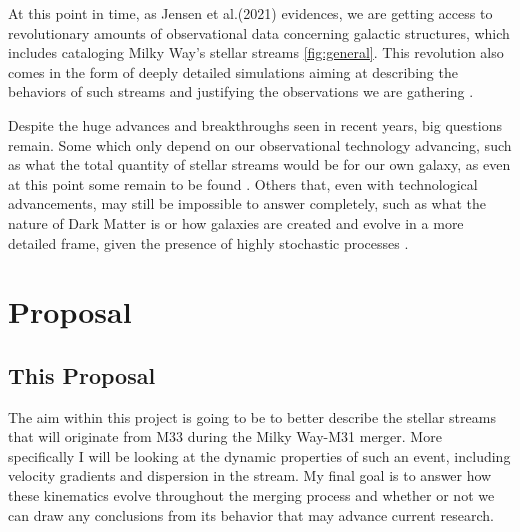 \documentclass[linenumbers,trackchanges]{aastex7}
\begin{document}
At this point in time, as Jensen et al.(2021) evidences, we are getting access to revolutionary amounts of observational data concerning galactic structures, which includes cataloging Milky Way's stellar streams \citep{Malhan2018-mh}\ref{fig:general}. This revolution also comes in the form of deeply detailed simulations aiming at describing the behaviors of such streams and justifying the observations we are gathering \citep{Choi2007-lc}.

\begin{figure*}[ht!]
\caption{Chart demonstrating potential stream stars identified in \citep{Malhan2018-mh}. This evidences the astounding capability we have to identify these objects, however this only accounts for a small portion of all stream stars.}
\label{fig:general}
\end{figure*}

Despite the huge advances and breakthroughs seen in recent years, big questions remain. Some which only depend on our observational technology advancing, such as what the total quantity of stellar streams would be for our own galaxy, as even at this point some remain to be found \citep{Shipp2023-qz}. Others that, even with technological advancements, may still be impossible to answer completely, such as what the nature of Dark Matter is or how galaxies are created and evolve in a more detailed frame, given the presence of highly stochastic processes \citep{Amorisco2017-oc}. 




\section{Proposal} \label{sec:style}

\subsection{This Proposal}

The aim within this project is going to be to better describe the stellar streams that will originate from M33 during the Milky Way-M31 merger. More specifically I will be looking at the dynamic properties of such an event, including velocity gradients and dispersion in the stream. My final goal is to answer how these kinematics evolve throughout the merging process and whether or not we can draw any conclusions from its behavior that may advance current research. 
\end{document}
